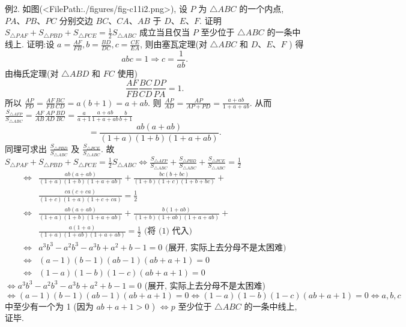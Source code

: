 例2. 如图(<FilePath:./figures/fig-c11i2.png>), 设 $P$ 为 $\triangle A B C$ 的一个内点, $P A 、 P B 、 P C$ 分别交边 $B C 、 C A 、 A B$ 于 $D 、 E 、 F$. 证明 $S_{\triangle P A F}+S_{\triangle P B D}+S_{\triangle P C E}=\frac{1}{2} S_{\triangle A B C}$ 成立当且仅当 $P$ 至少位于 $\triangle A B C$ 的一条中线上.
证明:设 $a=\frac{A F}{F B}, b=\frac{B D}{D C}, c=\frac{C E}{E A}$, 则由塞瓦定理(对 $\triangle A B C$ 和 $D 、 E 、 F$ ) 得
$$
a b c=1 \Rightarrow c=\frac{1}{a b} \text {. }
$$
由梅氏定理(对 $\triangle A B D$ 和 $F C$ 使用)
$$
\frac{A F}{F B} \frac{B C}{C D} \frac{D P}{P A}=1 \text {. }
$$
所以 $\frac{A P}{P D}=\frac{A F}{F B} \frac{B C}{C D}=a(b+1)=a+a b$.
则 $\frac{A P}{A D}=\frac{A P}{A P+P D}=\frac{a+a b}{1+a+a b}$.
从而 $\frac{S_{\triangle A F P}}{S_{\triangle A B C}}=\frac{A F}{A B} \frac{A P}{A D} \frac{B D}{B C}=\frac{a}{a+1} \frac{a+a b}{1+a+a b} \frac{b}{b+1}$
$$
=\frac{a b(a+a b)}{(1+a)(1+b)(1+a+a b)} \text {. }
$$
同理可求出 $\frac{S_{\triangle P B D}}{S_{\triangle A B C}}$ 及 $\frac{S_{\triangle P C E}}{S_{\triangle A B C}}$.
故 $S_{\triangle P A F}+S_{\triangle P B D}+S_{\triangle P C E}=\frac{1}{2} S_{\triangle A B C} \Leftrightarrow \frac{S_{\triangle A F P}}{S_{\triangle A B C}}+\frac{S_{\triangle P B D}}{S_{\triangle A B C}}+\frac{S_{\triangle P C E}}{S_{\triangle A B C}}=\frac{1}{2}$
$$
\begin{aligned}
\Leftrightarrow & \frac{a b(a+a b)}{(1+a)(1+b)(1+a+a b)}+\frac{b c(b+b c)}{(1+b)(1+c)(1+b+b c)}+ \\
& \frac{c a(c+c a)}{(1+c)(1+a)(1+c+c a)}=\frac{1}{2} \\
\Leftrightarrow & \frac{a b(a+a b)}{(1+a)(1+b)(1+a+a b)}+\frac{b(1+a b)}{(1+b)(1+a b)(1+a+a b)}+ \\
& \frac{a(1+a)}{(1+a)(1+a b)(1+a+a b)}=\frac{1}{2} \text { (将 (1) 代入) } \\
\Leftrightarrow & a^3 b^3-a^2 b^3-a^3 b+a^2+b-1=0 \text { (展开, 实际上去分母不是太困难) } \\
\Leftrightarrow & (a-1)(b-1)(a b-1)(a b+a+1)=0 \\
\Leftrightarrow & (1-a)(1-b)(1-c)(a b+a+1)=0
\end{aligned}
$$
$\Leftrightarrow a^3 b^3-a^2 b^3-a^3 b+a^2+b-1=0$ (展开, 实际上去分母不是太困难)
$\Leftrightarrow(a-1)(b-1)(a b-1)(a b+a+1)=0\Leftrightarrow(1-a)(1-b)(1-c)(a b+a+1)=0\Leftrightarrow a, b, c$ 中至少有一个为 1 (因为 $a b+a+1>0$ )
$\Leftrightarrow p$ 至少位于 $\triangle A B C$ 的一条中线上, 证毕.



